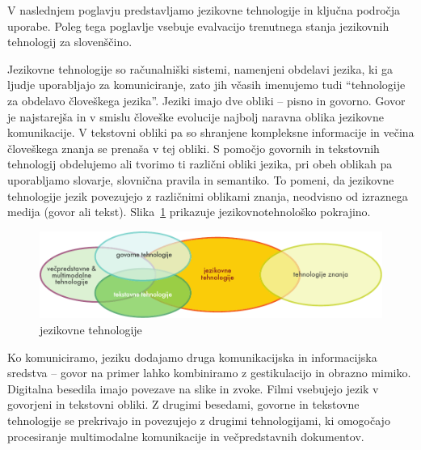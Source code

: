\begin{multicols}{2}
V naslednjem poglavju predstav\-ljamo jezikovne tehnologije in ključna področja uporabe. Poleg tega poglav\-lje vsebuje evalvacijo trenutnega stanja jezikovnih tehnologij za slovenščino.


\end{multicols}

\clearpage



\begin{multicols}{2}

Jezikovne tehnologije so računalniški sistemi, namenjeni obdelavi jezika, ki ga ljudje uporab\-ljajo za komuniciranje, zato jih včasih imenujemo tudi “tehnologije za obdelavo človeškega jezika”. Jeziki imajo  dve obliki – pisno in go\-vorno. Go\-vor je naj\-starejša in v smislu človeške evolucije naj\-bolj naravna oblika jezikovne komunikacije. V tekstovni obliki pa so shranjene kompleksne informacije in večina človeškega znanja se prenaša v tej obliki. S pomočjo go\-vornih in tekstovnih tehnologij obdelujemo ali tvorimo ti različni obliki jezika, pri obeh oblikah pa uporab\-ljamo slovarje, slovnična pravila in semantiko. To po\-meni, da jezikovne tehnologije jezik povezujejo z različnimi oblikami znanja, neodvisno od izraznega medija (go\-vor ali tekst). Slika~\ref{fig:ltincontext_de} prikazuje jezikovnotehnološko pokrajino. 

\begin{figure}[htb]
  \center
  \includegraphics[width=\textwidth]{../_media/slovene/language_technologies}
  \caption{jezikovne tehnologije}
  \label{fig:ltincontext_de}
\end{figure}
\vspace*{-0.009 cm}
Ko komuniciramo, jeziku dodajamo druga komunikacij\-ska in informacij\-ska sredstva – go\-vor na primer lahko kombiniramo z gestikulacijo in obrazno mimiko. Digitalna besedila imajo povezave na slike in zvoke. Filmi vsebujejo jezik v go\-vorjeni in tekstovni obliki. Z drugimi besedami, go\-vorne in tekstovne tehnologije se prekrivajo in povezujejo z drugimi tehnologijami, ki omogočajo procesiranje multimodalne komunikacije in večpredstavnih dokumentov.\vspace*{-0.009 cm}


\end{multicols}
